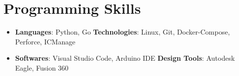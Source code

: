 \documentclass[letterpaper,11pt]{article}
\newcommand{\resumeSubHeadingListStart}{\begin{itemize}[leftmargin=*]}
\newcommand{\resumeSubHeadingListEnd}{\end{itemize}}
\begin{document}
  
\section{Programming Skills}
  	\resumeSubHeadingListStart
    		\item{
      			\textbf{Languages}{: Python, Go}
      			\hfill
      			\textbf{Technologies}{: Linux, Git, Docker-Compose, Perforce, ICManage}
    		}
		\item{
      			\textbf{Softwares}{: Visual Studio Code, Arduino IDE}
      			\hfill
      			\textbf{Design Tools}{: Autodesk Eagle, Fusion 360}
    		}
  	\resumeSubHeadingListEnd

\end{document}
